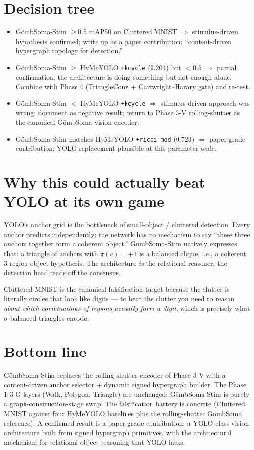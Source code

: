\documentclass[11pt,a4paper]{article}
\newcommand{\sig}{\ensuremath{\sigma}}
\newcommand{\Soma}{G\"ombSoma}
\newcommand{\Stim}{\Soma-Stim}
\begin{document}
\section{Decision tree}

\begin{itemize}
\item \Stim{} $\geq 0.5$ mAP50 on Cluttered MNIST $\Rightarrow$
  stimulus-driven hypothesis confirmed; write up as a paper
  contribution: ``content-driven hypergraph topology for detection.''
\item \Stim{} $\geq$ HyMeYOLO \texttt{+kcycle} (0.204) but $< 0.5$
  $\Rightarrow$ partial confirmation; the architecture is doing
  something but not enough alone. Combine with Phase 4 (TriangleConv
  + Cartwright--Harary gate) and re-test.
\item \Stim{} $<$ HyMeYOLO \texttt{+kcycle} $\Rightarrow$
  stimulus-driven approach was wrong; document as negative result;
  return to Phase 3-V rolling-shutter as the canonical \Soma{}
  vision encoder.
\item \Stim{} matches HyMeYOLO \texttt{+ricci-mod} (0.723) $\Rightarrow$
  paper-grade contribution; YOLO-replacement plausible at this
  parameter scale.
\end{itemize}

\section{Why this could actually beat YOLO at its own game}

YOLO's anchor grid is the bottleneck of small-object / cluttered
detection. Every anchor predicts independently; the network has no
mechanism to say ``these three anchors together form a coherent
object.'' \Stim{} natively expresses that: a triangle of anchors
with $\pi(c) = +1$ is a balanced clique, i.e., a coherent
3-region object hypothesis. The architecture \emph{is} the
relational reasoner; the detection head reads off the consensus.

Cluttered MNIST is the canonical falsification target because the
clutter is literally circles that look like digits --- to beat the
clutter you need to reason \emph{about which combinations of
regions actually form a digit}, which is precisely what
$\sig$-balanced triangles encode.

\section{Bottom line}

\Stim{} replaces the rolling-shutter encoder of Phase 3-V with a
content-driven anchor selector + dynamic signed hypergraph builder.
The Phase 1-3-G layers (Walk, Polygon, Triangle) are unchanged;
\Stim{} is purely a graph-construction-stage swap. The
falsification battery is concrete (Cluttered MNIST against four
HyMeYOLO baselines plus the rolling-shutter \Soma{} reference).
A confirmed result is a paper-grade contribution: a YOLO-class
vision architecture built from signed hypergraph primitives, with
the architectural mechanism for relational object reasoning that
YOLO lacks.
\end{document}
